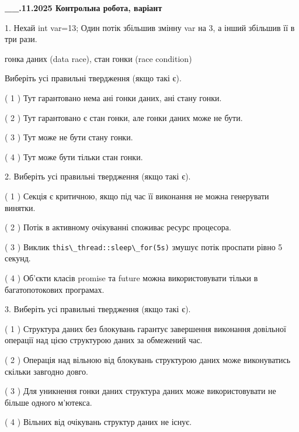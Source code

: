\documentclass[12pt, ukrainian]{article}
\def\code#1{\Verb!#1!}
\begin{document}
\newpage
\begin {large}

\textbf{\_\_.11.2025 Контрольна робота, варіант  }\par


{
1. Нехай int var=13; Один потік збільшив змінну var на 3, а інший збільшив її в три рази.

гонка даних (data race), стан гонки (race condition)

Виберіть усі правильні твердження (якщо такі є).\par
\vspace{2mm}
( 1 ) Тут гарантовано нема ані гонки даних, ані стану гонки.%

( 2 ) Тут гарантовано є стан гонки, але гонки даних може не бути.%

( 3 ) Тут може не бути стану гонки.%

( 4 ) Тут може бути тільки стан гонки.%


2. Виберіть усі правильні твердження (якщо такі є).\par
\vspace{2mm}

( 1 ) Секція є критичною, якщо під час її виконання не можна генерувати винятки.%

( 2 ) Потік в активному очікуванні споживає ресурс процесора.%

( 3 ) Виклик \code{this\_thread::sleep\_for(5s)} змушує потік проспати рівно 5 секунд.%

( 4 ) Об’єкти класів promise та future можна використовувати тільки в багатопотокових програмах.%


3. Виберіть усі правильні твердження (якщо такі є).\par
\vspace{2mm}

( 1 ) Структура даних без блокувань гарантує завершення виконання довільної операції над цією структурою даних за обмежений час.%

( 2 ) Операція над вільною від блокувань структурою даних може виконуватись скільки завгодно довго.%

( 3 ) Для уникнення гонки даних структура даних може використовувати не більше одного м’ютекса.%

( 4 ) Вільних від очікувань структур даних не існує.%


}
\end{large}
\end{document}
